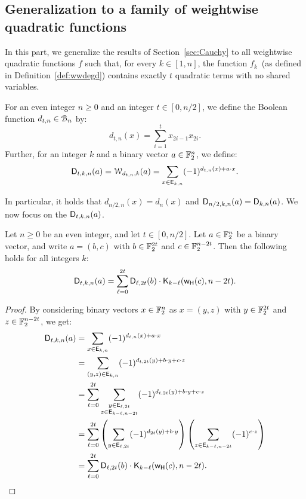 \documentclass[11pt]{llncs}
\begin{document}
\subsection{Generalization to a family of weightwise quadratic functions}\label{sec:general}


In this part, we generalize the results of Section~\ref{sec:Cauchy} to all weightwise quadratic functions $f$ such that, for every $k \in [1, n]$, the function $f_k$ (as defined in Definition~\ref{def:wwdegd}) contains exactly $t$ quadratic terms with no shared variables.

\begin{definition}
	For an even integer $n\geq 0$ and an integer $t\in[0,n/2]$, we define the Boolean function $d_{t,n}\in\mathcal{B}_n$ by:
	\[
		d_{t,n}(x)=\sum_{i=1}^t x_{2i-1} x_{2i}.
	\]
	Further, for an integer $k$ and a binary vector $a\in\mathbb{F}_2^n$, we define:
	\[
		\mathsf{D}_{t,k,n}(a)=\mathcal{W}_{d_{t,n},k}(a)=\sum_{x\in \mathsf{E}_{k,n}} (-1)^{d_{t,n}(x) +a\cdot x}.
	\]
\end{definition}

In particular, it holds that $d_{n/2,n}(x)=d_n(x)$ and $\mathsf{D}_{n/2,k,n}(a)=\mathsf{D}_{k,n}(a)$.
We now focus on the $\mathsf{D}_{t,k,n}(a)$.

\begin{proposition}\label{proposition:dtn}
    Let $n\geq 0$ be an even integer, and let $t\in[0,n/2]$. Let $a\in\mathbb{F}_2^n$ be a binary vector, and write $a=(b,c)$ with $b\in\mathbb{F}_2^{2t}$ and $c\in\mathbb{F}_2^{n-2t}$. Then the following holds for all integers $k$:
	\[
		\mathsf{D}_{t,k,n}(a)=\sum_{\ell=0}^{2t} \mathsf{D}_{\ell,2t}(b)\cdot\mathsf{K}_{k-\ell}(\mathsf{w_H}(c),n-2t).
	\]
\end{proposition}

\begin{proof}
    By considering binary vectors $x\in\mathbb{F}_2^n$ as $x=(y,z)$ with $y\in\mathbb{F}_2^{2t}$ and $z\in\mathbb{F}_2^{n-2t}$, we get:	
	\begin{align*}
		\mathsf{D}_{t,k,n}(a)&=\sum_{x \in \mathsf{E}_{k,n}} (-1)^{d_{t,n}(x)+a \cdot x}\\
		&=\sum_{(y,z)\in\mathsf{E}_{k,n}} (-1)^{d_{t,2t}(y)+b \cdot y +c \cdot z}\\
		&=\sum_{\ell=0}^{2t} \sum_{\substack{y \in \mathsf{E}_{\ell,2t}\\z \in \mathsf{E}_{k-\ell,n-2t}}} (-1)^{d_{t,2t}(y)+b \cdot y +c \cdot z}\\
		&=\sum_{\ell=0}^{2t}\left(\sum_{y \in \mathsf{E}_{\ell,2t}} (-1)^{d_{2t}(y)+b \cdot y}\right)\left( \sum_{z \in \mathsf{E}_{k-\ell,n-2t}} (-1)^{c \cdot z}\right)\\&=\sum_{\ell=0}^{2t} \mathsf{D}_{\ell,2t}(b)\cdot\mathsf{K}_{k-\ell}(\mathsf{w_H}(c),n-2t).\qedhere
	\end{align*}
\end{proof}
\end{document}
